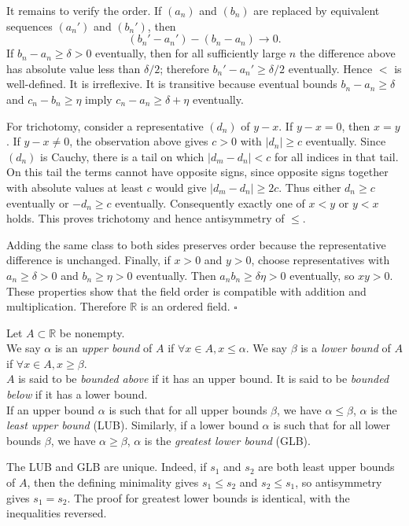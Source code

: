 \documentclass[a4paper,11pt,abstracton]{scrartcl}
\newcommand{\RR}{\mathbb{R}}
\theoremstyle{dotlessP}
\theoremstyle{dotlessS}
\theoremstyle{remark}
\theoremstyle{definition}
\begin{document}
\begin{claim_box}
It remains to verify the order. If $(a_n)$ and $(b_n)$ are replaced
by equivalent sequences $(a_n')$ and $(b_n')$, then
\[
 (b_n'-a_n')-(b_n-a_n)\to0.
\]
If $b_n-a_n\ge\delta>0$ eventually, then for all sufficiently large
$n$ the difference above has absolute value less than $\delta/2$;
therefore $b_n'-a_n'\ge\delta/2$ eventually. Hence $<$ is
well-defined. It is irreflexive. It is transitive because eventual
bounds $b_n-a_n\ge\delta$ and $c_n-b_n\ge\eta$ imply
$c_n-a_n\ge\delta+\eta$ eventually.

For trichotomy, consider a representative $(d_n)$ of $y-x$.
If $y-x=0$, then $x=y$. If $y-x\ne0$, the observation above gives
$c>0$ with $|d_n|\ge c$ eventually. Since $(d_n)$ is Cauchy, there
is a tail on which $|d_m-d_n|<c$ for all indices in that tail.
On this tail the terms cannot have opposite signs, since opposite
signs together with absolute values at least $c$ would give
$|d_m-d_n|\ge2c$. Thus either $d_n\ge c$ eventually or
$-d_n\ge c$ eventually. Consequently exactly one of $x<y$ or
$y<x$ holds. This proves trichotomy and hence antisymmetry of $\le$.

Adding the same class to both sides preserves order because the
representative difference is unchanged. Finally, if $x>0$ and $y>0$,
choose representatives with $a_n\ge\delta>0$ and
$b_n\ge\eta>0$ eventually. Then
$a_nb_n\ge\delta\eta>0$ eventually, so $xy>0$.
These properties show that the field order is compatible with
addition and multiplication. Therefore $\RR$ is an ordered field.
\hfill$\square$
\end{claim_box}

\begin{definition_box}
Let $A \subset \RR$ be nonempty. 
\\We say $\alpha$ is an \emph{upper bound} of $A$ if $\forall x \in A, x \le \alpha$. 
We say $\beta$ is a \emph{lower bound} of $A$ if $\forall x \in A, x \ge \beta$. 
\\$A$ is said to be \emph{bounded above} if it has an upper bound. It is said to be \emph{bounded below} if it has a lower bound. 
\\If an upper bound $\alpha$ is such that for all upper bounds $\beta$, we have $\alpha \le \beta$, $\alpha$ is the \emph{least upper bound} (LUB). 
Similarly, if a lower bound $\alpha$ is such that for all lower bounds $\beta$, we have $\alpha \ge \beta$, $\alpha$ is the \emph{greatest lower bound} (GLB).
\end{definition_box}

The LUB and GLB are unique. Indeed, if $s_1$ and $s_2$ are both least
upper bounds of $A$, then the defining minimality gives
$s_1\le s_2$ and $s_2\le s_1$, so antisymmetry gives $s_1=s_2$.
The proof for greatest lower bounds is identical, with the inequalities
reversed.
\end{document}

